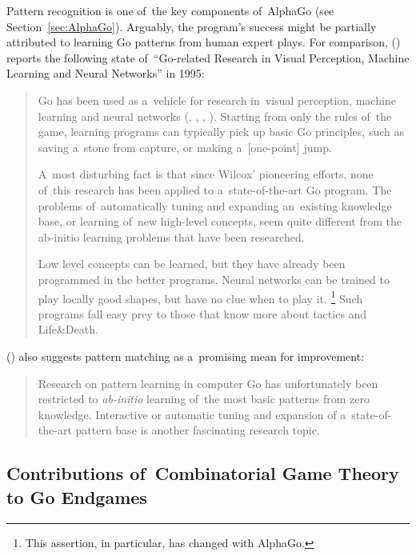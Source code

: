 Pattern recognition is one of~the key components of~AlphaGo (see Section~\ref{sec:AlphaGo}).
Arguably, the program's success might be partially attributed to learning Go patterns from human expert plays.
For comparison, (\cite{Muller1995computer}) reports the following state of~``Go-related Research in Visual Perception, Machine Learning and Neural Networks'' in 1995:
\begin{quotation}
  Go has been used as a~vehicle for research in~visual perception, machine learning and neural networks (\cite{Wilcox79}, \cite{Enderton1991golem}, \cite{Stoutamire1991machine}, \cite{Schraudolph1994temporal}).
  Starting from only the rules of~the game, learning programs can typically pick up basic Go principles, such as saving a~stone from capture, or making a~[one-point] jump.

  A~most disturbing fact is that since Wilcox’ pioneering efforts, none of~this research has been applied to a~state-of-the-art Go program.
  The problems of~automatically tuning and expanding an~existing knowledge base, or learning of~new high-level concepts, seem quite different from the ab-initio learning problems that have been researched.

  Low level concepts can be learned, but they have already been programmed in the better programs.
  Neural networks can be trained to play locally good shapes, but have no clue when to play it.%
  \footnote{This assertion, in particular, has changed with AlphaGo.}
  Such programs fall easy prey to those that know more about tactics and Life\&Death.
\end{quotation}
(\cite{Muller1995computer}) also suggests pattern matching as a~promising mean for improvement:
\begin{quotation}
  Research on pattern learning in computer Go has unfortunately been restricted to \emph{ab-initio} learning of~the most basic patterns from zero knowledge.
  Interactive or automatic tuning and expansion of a~state-of-the-art pattern base is another fascinating research topic.
\end{quotation}

\subsection{Contributions of~Combinatorial Game Theory to Go Endgames}

